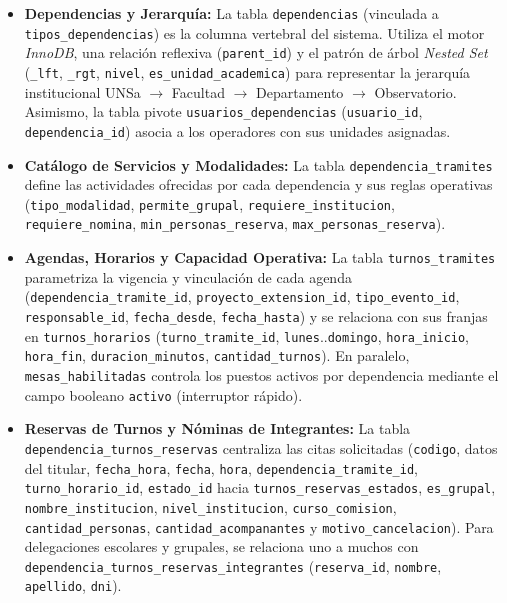 \begin{itemize}
    \item \textbf{Dependencias y Jerarquía:} La tabla \texttt{dependencias} (vinculada a \texttt{tipos\_\allowbreak dependencias}) es la columna vertebral del sistema. Utiliza el motor \textit{InnoDB}, una relación reflexiva (\texttt{parent\_\allowbreak id}) y el patrón de árbol \textit{Nested Set} (\texttt{\_lft}, \texttt{\_rgt}, \texttt{nivel}, \texttt{es\_\allowbreak unidad\_\allowbreak academica}) para representar la jerarquía institucional UNSa $\rightarrow$ Facultad $\rightarrow$ Departamento $\rightarrow$ Observatorio. Asimismo, la tabla pivote \texttt{usuarios\_\allowbreak dependencias} (\texttt{usuario\_\allowbreak id}, \texttt{dependencia\_\allowbreak id}) asocia a los operadores con sus unidades asignadas.
    \item \textbf{Catálogo de Servicios y Modalidades:} La tabla \texttt{dependencia\_\allowbreak tramites} define las actividades ofrecidas por cada dependencia y sus reglas operativas (\texttt{tipo\_\allowbreak modalidad}, \texttt{permite\_\allowbreak grupal}, \texttt{requiere\_\allowbreak institucion}, \texttt{requiere\_\allowbreak nomina}, \texttt{min\_\allowbreak personas\_\allowbreak reserva}, \texttt{max\_\allowbreak personas\_\allowbreak reserva}).
    \item \textbf{Agendas, Horarios y Capacidad Operativa:} La tabla \texttt{turnos\_\allowbreak tramites} parametriza la vigencia y vinculación de cada agenda (\texttt{dependencia\_\allowbreak tramite\_\allowbreak id}, \texttt{proyecto\_\allowbreak extension\_\allowbreak id}, \texttt{tipo\_\allowbreak evento\_\allowbreak id}, \texttt{responsable\_\allowbreak id}, \texttt{fecha\_\allowbreak desde}, \texttt{fecha\_\allowbreak hasta}) y se relaciona con sus franjas en \texttt{turnos\_\allowbreak horarios} (\texttt{turno\_\allowbreak tramite\_\allowbreak id}, \texttt{lunes}..\texttt{domingo}, \texttt{hora\_\allowbreak inicio}, \texttt{hora\_\allowbreak fin}, \texttt{duracion\_\allowbreak minutos}, \texttt{cantidad\_\allowbreak turnos}). En paralelo, \texttt{mesas\_\allowbreak habilitadas} controla los puestos activos por dependencia mediante el campo booleano \texttt{activo} (interruptor rápido).
    \item \textbf{Reservas de Turnos y Nóminas de Integrantes:} La tabla \texttt{dependencia\_\allowbreak turnos\_\allowbreak reservas} centraliza las citas solicitadas (\texttt{codigo}, datos del titular, \texttt{fecha\_\allowbreak hora}, \texttt{fecha}, \texttt{hora}, \texttt{dependencia\_\allowbreak tramite\_\allowbreak id}, \texttt{turno\_\allowbreak horario\_\allowbreak id}, \texttt{estado\_\allowbreak id} hacia \texttt{turnos\_\allowbreak reservas\_\allowbreak estados}, \texttt{es\_\allowbreak grupal}, \texttt{nombre\_\allowbreak institucion}, \texttt{nivel\_\allowbreak institucion}, \texttt{curso\_\allowbreak comision}, \texttt{cantidad\_\allowbreak personas}, \texttt{cantidad\_\allowbreak acompanantes} y \texttt{motivo\_\allowbreak cancelacion}). Para delegaciones escolares y grupales, se relaciona uno a muchos con \texttt{dependencia\_\allowbreak turnos\_\allowbreak reservas\_\allowbreak integrantes} (\texttt{reserva\_\allowbreak id}, \texttt{nombre}, \texttt{apellido}, \texttt{dni}).

\end{itemize}
